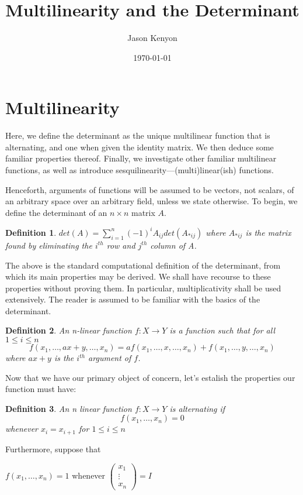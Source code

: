 \documentclass{article}
\title{Multilinearity and the Determinant}
\date{\today}
\author{Jason Kenyon}
\newtheorem{defn}{Definition}
\begin{document}
\maketitle
\section{Multilinearity}
Here, we define the determinant as the unique multilinear function that is alternating, and one when given the identity matrix.
We then deduce some familiar properties thereof. Finally, we investigate other familiar multilinear functions, as well as introduce sesquilinearity---(multi)linear(ish) functions. 

Henceforth, arguments of functions will be assumed to be vectors, not scalars, of an arbitrary space over an arbitrary field,
unless we state otherwise. 
To begin, we define the determinant of an $n \times n$ matrix $A$.
\begin{defn}
$det(A)=\sum\limits_{i=1}^{n}(-1)^iA_{ij}det(A_{*ij})$ where $A_{*ij}$ is the matrix found by eliminating the $i^{th}$ row and $j^{th}$ column of A.
\end{defn}
The above is the standard computational definition of the determinant, from which its main properties may be derived. We shall have recourse to these properties without proving them. In particular, multiplicativity shall be used extensively. The reader is assumed to be familiar with the basics of the determinant.
\begin{defn}
An n-linear function $f:X \to Y$ is a function such that for all $1\leq i\leq n$ 
$$f(x_1, \dots, ax+y, \dots, x_n)=af(x_1, \dots, x, \dots, x_n)+f(x_1,\dots, y,\dots,x_n)$$
where $ax+y$ is the $i^{th}$ argument of $f$.
\end{defn}
Now that we have our primary object of concern, let's estalish the properties our function must have:
\begin{defn}
An n linear function $f:X \to Y$ is alternating if $$f(x_1, \dots, x_n)=0$$ whenever $x_i=x_{i+1}$ for $1\leq i\leq n$
\end{defn}
Furthermore, suppose that 

$f(x_1, \dots, x_n)=1$ whenever $\begin{pmatrix}
x_1 \\
\vdots \\
x_n
\end{pmatrix}=I$
\end{document}

